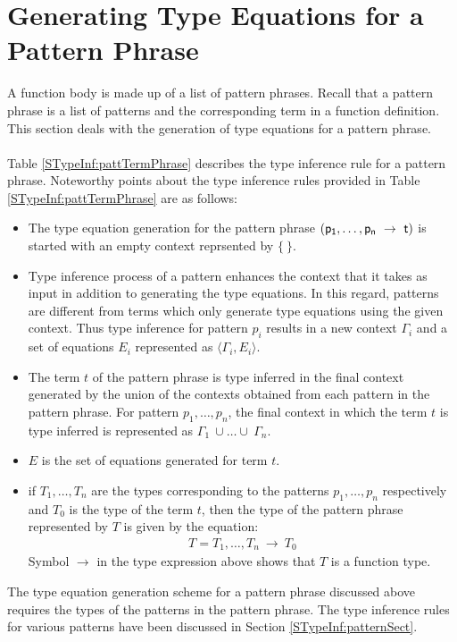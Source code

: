 \documentclass[11pt]{article}
\begin{document}
\section {Generating Type Equations for a Pattern Phrase} \label{STypeInf:SectPattPhrase}
A function body is made up of a list of pattern phrases. Recall that a pattern phrase is a list of patterns and the corresponding term in a function definition. This section deals with the generation of type equations for a pattern phrase.
~~\\~~\\ 
Table \ref {STypeInf:pattTermPhrase} describes the type inference rule for a pattern phrase. Noteworthy points about the type inference rules provided in Table \ref {STypeInf:pattTermPhrase} are as follows:
\begin{itemize}
  \item The type equation generation for the pattern phrase ${\sf (p_1,\ldots,p_n~\to~ t)}$ is started with an empty context reprsented by ${\{~\}}$.
  \item Type inference process of a pattern enhances the context that it takes as input in addition to generating the type equations. In this regard, patterns are different from {\sf terms} which only generate type equations using the given context. Thus type inference for pattern ${p_i}$ results in a new context ${\Gamma_i}$ and a set of equations ${E_i}$ represented as ${\big\langle \Gamma_i,E_i \big\rangle}$.
  \item The term ${t}$ of the pattern phrase is type inferred in the final context generated by the union of the contexts obtained from each pattern in the pattern phrase. For pattern ${p_1,\ldots,p_n}$, the final context in which the term ${t}$ is type inferred is represented as ${\Gamma_1~\cup\ldots\cup~\Gamma_n}$.
  \item ${E}$ is the set of equations generated for term ${t}$.
  \item if ${T_1,\ldots,T_n}$ are the types corresponding to the patterns ${p_1,\ldots,p_n}$ respectively and ${T_0}$ is the type of the term ${t}$, then the type of the pattern phrase represented by ${T}$ is given by the equation:
  \begin{align*}
  T = T_1,\ldots,T_n~\to~T_0
  \end{align*}
  Symbol ${\to}$ in the type expression above shows that ${T}$ is a function type.
\end{itemize}
The type equation generation scheme for a pattern phrase discussed above requires the types of the patterns in the pattern phrase. The type inference rules for various patterns have been discussed in Section \ref {STypeInf:patternSect}.
\end{document}
